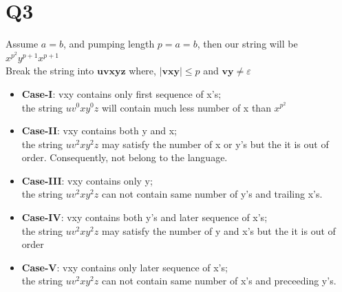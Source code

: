 \documentclass{article}
\begin{document}
\section{Q3}
Assume $a=b$, and pumping length $p = a = b$, then our string will be $x^{p^2}y^{p+1}x^{p+1}$\\
Break the string into $\textbf{uvxyz}$ where, $\mid \textbf{vxy} \mid \leq	p $ and $\textbf{vy} \neq \varepsilon$
\begin{itemize}
	\item \textbf{Case-I}: vxy contains only first sequence of x's;\\
	the string $uv^0xy^0z$ will contain much less number of x than $ x^{p^2} $
	
	\item \textbf{Case-II}: vxy contains both y and x;\\
	the string $uv^2xy^2z$ may satisfy the number of x or y's but the it is out of order. Consequently, not belong to the language.
	
	\item \textbf{Case-III}: vxy contains only y;\\
	the string $uv^2xy^2z$ can not contain same number of y's and trailing x's.
	
	\item \textbf{Case-IV}: vxy contains both y's and later sequence of x's;\\
	the string $uv^2xy^2z$ may satisfy the number of y and x's but the it is out of order
	
	\item \textbf{Case-V}: vxy contains only later sequence of x's;\\
	the string $uv^2xy^2z$ can not contain same number of x's and preceeding y's.
	
\end{itemize}

	
\end{document}
